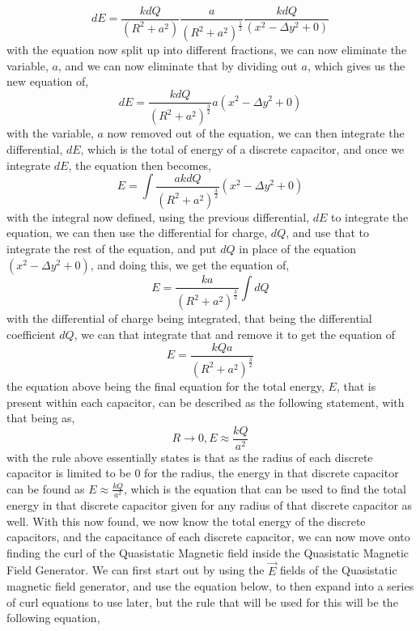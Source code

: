\documentclass[]{article}
\begin{document}
\begin{equation}
dE = \frac{kdQ}{(R^2 + a^2)} \frac{a}{(R^2+a^2)^\frac{1}{2}}\frac{kdQ}{(x^2-\Delta{y}^2+0)}
\end{equation}
with the equation now split up into different fractions, we can now eliminate the variable, $a$, and we can now eliminate that by dividing out $a$, which gives us the new equation of,
\begin{equation}
dE = \frac{kdQ}{(R^2+a^2)^\frac{3}{2}} a(x^2-\Delta{y}^2+0)
\end{equation}
with the variable, $a$ now removed out of the equation, we can then integrate the differential, $dE$, which is the total of energy of a discrete capacitor, and once we integrate $dE$, the equation then becomes, 
\begin{equation}
E = \int \frac{akdQ}{(R^2+a^2)^\frac{3}{2}} (x^2 - \Delta{y}^2 + 0)
\end{equation}
with the integral now defined, using the previous differential, $dE$ to integrate the equation, we can then use the differential for charge, $dQ$, and use that to integrate the rest of the equation, and put $dQ$ in place of the equation $(x^2-\Delta{y}^2+0)$, and doing this, we get the equation of,
\begin{equation}
E = \frac{ka}{(R^2+a^2)^\frac{3}{2}} \int dQ
\end{equation}
with the differential of charge being integrated, that being the differential coefficient $dQ$, we can that integrate that and remove it to get the equation of
\begin{equation}
E = \frac{kQa}{(R^2+a^2)^\frac{3}{2}}
\end{equation}
the equation above being the final equation for the total energy, $E$, that is present within each capacitor, can be described as the following statement, with that being as,
\begin{equation}
R \rightarrow 0, E \approx \frac{kQ}{a^2}
\end{equation}
with the rule above essentially states is that as the radius of each discrete capacitor is limited to be 0 for the radius, the energy in that discrete capacitor can be found as $E \approx \frac{kQ}{a^2}$, which is the equation that can be used to find the total energy in that discrete capacitor given for any radius of that discrete capacitor as well. With this now found, we now know the total energy of the discrete capacitors, and the capacitance of each discrete capacitor, we can now move onto finding the curl of the Quasistatic Magnetic field inside the Quasistatic Magnetic Field Generator. We can first start out by using the $\vec{E}$ fields of the Quasistatic magnetic field generator, and use the equation below, to then expand into a series of curl equations to use later, but the rule that will be used for this will be the following equation,
\end{document}
